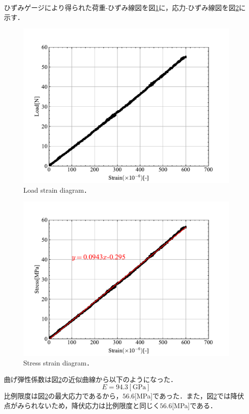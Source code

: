 ひずみゲージにより得られた荷重-ひずみ線図を図\ref{fig:荷重ひずみ線図}に，応力-ひずみ線図を図\ref{fig:応力ひずみ線図}に示す．
\begin{figure}[htbp]
    \centering %
    \includegraphics[width=100truemm,clip]{fig/fig_LoadStrain.pdf}
    \caption{Load strain diagram．}
    \label{fig:荷重ひずみ線図}
\end{figure}
\begin{figure}[htbp]
    \centering %
    \includegraphics[width=100truemm,clip]{fig/fig_StressStrain.pdf}
    \caption{Stress strain diagram．}
    \label{fig:応力ひずみ線図}
\end{figure}

曲げ弾性係数は図\ref{fig:応力ひずみ線図}の近似曲線から以下のようになった．
\begin{equation}
    E = 94.3[\mathrm{GPa}]
    \label{eq:曲げ弾性係数}
\end{equation}
比例限度は図\ref{fig:応力ひずみ線図}の最大応力であるから，$56.6$[MPa]であった．また，図\ref{fig:応力ひずみ線図}では降伏点がみられないため，降伏応力は比例限度と同じく$56.6$[MPa]である．

